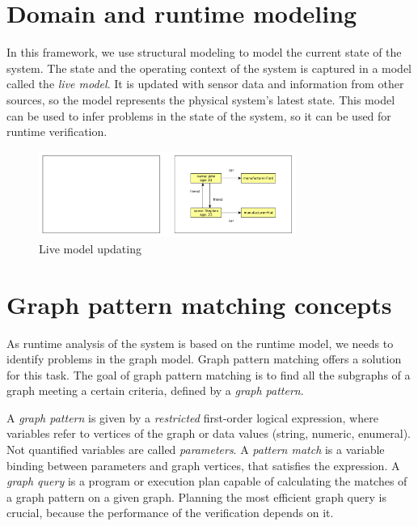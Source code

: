 \section{Domain and runtime modeling}

In this framework, we use structural modeling to model the current state of the system. 
The state and the operating context of the system is captured in a model called the \emph{live model}.
It is updated with sensor data and information from other sources, so the model represents the physical system's latest state. 
This model can be used to infer problems in the state of the system, so it can be used for runtime verification.



\begin{figure}[h]
	\begin{center}
		\includegraphics[width=0.75\textwidth]{figures/live-models.pdf}
		\caption{Live model updating}
		\label{fig:live-models}
	\end{center}
\end{figure}

\section{Graph pattern matching concepts}

As runtime analysis of the system is based on the runtime model, we needs to identify problems in the graph model. 
Graph pattern matching offers a solution for this task. 
The goal of graph pattern matching is to find all the subgraphs of a graph meeting a certain criteria, defined by a \emph{graph pattern}.

A \emph{graph pattern} is given by a \emph{restricted} first-order logical expression, where variables refer to vertices of the graph or data values (string, numeric, enumeral).
Not quantified variables are called \emph{parameters}.  
A \emph{pattern match} is a variable binding between parameters and graph vertices, that satisfies the expression.
A \emph{graph query} is a program or execution plan capable of calculating the matches of a graph pattern on a given graph. 
Planning the most efficient graph query is crucial, because the performance of the verification depends on it.

